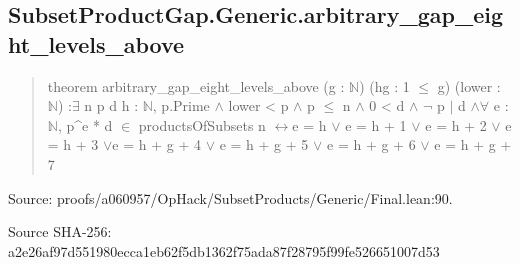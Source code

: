 \documentclass[11pt,a4paper]{article}
\begin{document}
\begin{samepage}
\subsection{SubsetProductGap.Generic.arbitrary\_gap\_eight\_levels\_above}
\begin{quote}\small\ttfamily theorem arbitrary\_gap\_eight\_levels\_above (g : \ensuremath{\mathbb{N}}) (hg : 1 \ensuremath{\leq} g) (lower : \ensuremath{\mathbb{N}}) :\newline     \ensuremath{\exists} n p d h : \ensuremath{\mathbb{N}}, p.Prime \ensuremath{\wedge} lower < p \ensuremath{\wedge} p \ensuremath{\leq} n \ensuremath{\wedge} 0 < d \ensuremath{\wedge} \ensuremath{\neg} p \ensuremath{\mid} d \ensuremath{\wedge}\newline       \ensuremath{\forall} e : \ensuremath{\mathbb{N}}, p\textasciicircum{}e * d \ensuremath{\in} productsOfSubsets n \ensuremath{\leftrightarrow}\newline         e = h \ensuremath{\vee} e = h + 1 \ensuremath{\vee} e = h + 2 \ensuremath{\vee} e = h + 3 \ensuremath{\vee}\newline           e = h + g + 4 \ensuremath{\vee} e = h + g + 5 \ensuremath{\vee} e = h + g + 6 \ensuremath{\vee} e = h + g + 7\end{quote}
{\small Source: proofs/a060957/OpHack/SubsetProducts/Generic/Final.lean:90.\par}

{\small Source SHA-256: a2e26af97d551980ecca1eb62f5db1362f75ada87f28795f99fe526651007d53\par}

\end{samepage}
\end{document}

